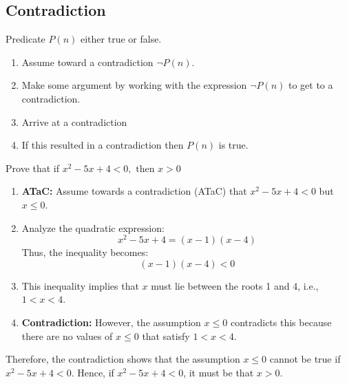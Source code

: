 \subsection{Contradiction}
    \begin{process}
        Predicate $P(n)$ either true or false.
        \begin{enumerate}
            \item Assume toward a contradiction $\neg P(n)$.
            \item Make some argument by working with the expression $\neg P(n)$ to get to a contradiction.
            \item Arrive at a contradiction
            \item If this resulted in a contradiction then $P(n)$ is true. 
        \end{enumerate}
        
    \end{process}

    \begin{example}
        Prove that if $x^2 - 5x + 4 < 0, \text{ then } x >0$
        \begin{enumerate}
            \item \textbf{ATaC:} Assume towards a contradiction (ATaC) that \( x^2 - 5x + 4 < 0 \) but \( x \leq 0 \).
            \vspace{1em}
            \item Analyze the quadratic expression:
            \[
            x^2 - 5x + 4 = (x - 1)(x - 4)
            \]
            Thus, the inequality becomes:
            \[
            (x - 1)(x - 4) < 0
            \]
            
            \item This inequality implies that \( x \) must lie between the roots 1 and 4, i.e., \( 1 < x < 4 \).
            \vspace{1em}
            \item \textbf{Contradiction:} However, the assumption \( x \leq 0 \) contradicts this because there are no values of \( x \leq 0 \) that satisfy \( 1 < x < 4 \).
            \end{enumerate}
            \vspace{1em}
            Therefore, the contradiction shows that the assumption \( x \leq 0 \) cannot be true if \( x^2 - 5x + 4 < 0 \). Hence, if \( x^2 - 5x + 4 < 0 \), it must be that \( x > 0 \).
    \end{example}

